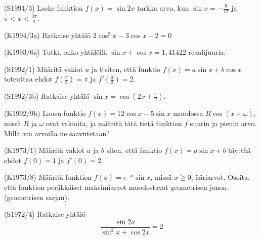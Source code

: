 \begin{tehtava} (S1994/3)
	Laske funktion $f(x)=\sin2x$ tarkka arvo, kun $\sin x=-\frac{8}{17}$ ja $\pi<x<\frac{3\pi}{2}$.
\end{tehtava}

\begin{tehtava} (K1994/3a)
	Ratkaise yhtälö $2\cos^2x-3\cos x-2=0$
\end{tehtava}

\begin{tehtava} (K1993/6a)
	Tutki, onko yhtälöllä $\sin x+\cos x=1,41422$ reaalijuuria.
\end{tehtava}

\begin{tehtava} (S1992/1)
	Määritä vakiot $a$ ja $b$ siten, että funktio $f(x)=a\sin x+b\cos x$ toteuttaa ehdot $f(\frac{\pi}{2})=\pi$ 
	ja $f'(\frac{\pi}{2})=2$.
\end{tehtava}

\begin{tehtava} (S1992/3b)
	Ratkaise yhtälö $\sin x=\cos(2x+\frac{\pi}{2})$.
\end{tehtava}

\begin{tehtava} (K1992/9b)
	Lausu funktio $f(x)=12\cos x-5\sin x$ muodossa $R\cos(x+\omega)$, missä $R$ ja $\omega$ ovat vakioita, ja 
	määritä tätä tietä funktion $f$ suurin ja pienin arvo. Millä $x$:n arvoilla ne saavutetaan?
\end{tehtava}

\begin{tehtava} (K1973/1)
	Määritä vakiot $a$ ja $b$ siten, että funktio $f(x)=a\sin x+b$ täyttää ehdot $f(0)=1$ ja $f'(0)=2$.
\end{tehtava}

\begin{tehtava} (K1973/8)
	Määritä funktion $f(x)=e^{-x}\sin x$, missä $x\geq0$, ääriarvot. Osoita, että funktion peräkkäiset maksimiarvot muodostavat 
	geometrisen jonon (geometrisen sarjan).
\end{tehtava}

\begin{tehtava} (S1972/4)
	Ratkaise yhtälö \[\frac{\sin2x}{\sin^2x+\cos2x}=2\]
\end{tehtava}

